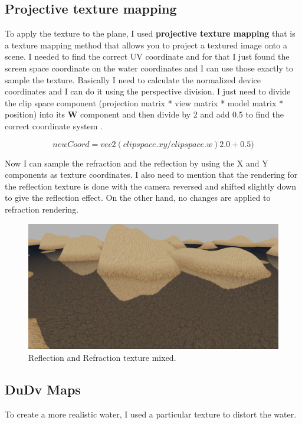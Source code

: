 \subsection{Projective texture mapping}
To apply the texture to the plane, I used \textbf{projective texture mapping} that is a texture mapping method that allows you to project a textured image onto a scene. I needed to find the correct UV coordinate and for that I just found the screen space coordinate on the water coordinates and I can use those exactly to sample the texture. Basically I need to calculate the normalized device coordinates and I can do it using the perspective division. I just need to divide the clip space component (projection matrix * view matrix * model matrix * position) into its \textbf{W} component and then divide by 2 and add 0.5 to find the correct coordinate system .

\begin{equation}
newCoord = vec2(clipspace.xy / clipspace.w) 2.0 + 0.5)		
\end{equation}

\noindent
Now I can sample the refraction and the reflection by using the X and Y components as texture coordinates.
I also need to mention that the rendering for the reflection texture is done with the camera reversed and shifted slightly down to give the reflection effect. On the other hand, no changes are applied to refraction rendering.

\newpage

\begin{figure}[hbt!]
	\centering
	\includegraphics[width= 1
	\textwidth]{images/Water3.png}
	\caption{Reflection and Refraction texture mixed.}
\end{figure} 

\subsection{DuDv Maps}
To create a more realistic water, I used a particular texture to distort the water.

